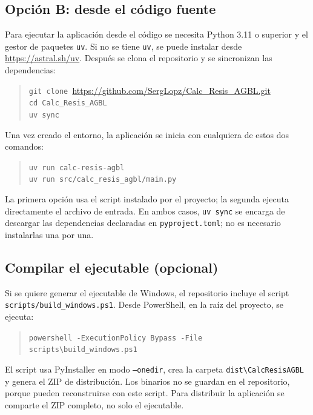 \documentclass[journal]{IEEEtran}
\begin{document}
\subsection{Opción B: desde el código fuente}

Para ejecutar la aplicación desde el código se necesita Python 3.11 o superior y el gestor de paquetes \texttt{uv}. Si no se tiene \texttt{uv}, se puede instalar desde \url{https://astral.sh/uv}. Después se clona el repositorio y se sincronizan las dependencias:
\begin{quote}
  \small
  \noindent\texttt{git clone }\url{https://github.com/SergLopz/Calc_Resis_AGBL.git}\\
  \texttt{cd Calc\_Resis\_AGBL}\\
  \texttt{uv sync}
\end{quote}

Una vez creado el entorno, la aplicación se inicia con cualquiera de estos dos comandos:
\begin{quote}
  \small
  \noindent\texttt{uv run calc-resis-agbl}\\
  \texttt{uv run src/calc\_resis\_agbl/main.py}
\end{quote}

La primera opción usa el script instalado por el proyecto; la segunda ejecuta directamente el archivo de entrada. En ambos casos, \texttt{uv sync} se encarga de descargar las dependencias declaradas en \texttt{pyproject.toml}; no es necesario instalarlas una por una.

\subsection{Compilar el ejecutable (opcional)}

Si se quiere generar el ejecutable de Windows, el repositorio incluye el script \texttt{scripts/build\_windows.ps1}. Desde PowerShell, en la raíz del proyecto, se ejecuta:
\begin{quote}
  \small
  \noindent\texttt{powershell -ExecutionPolicy Bypass -File scripts\textbackslash build\_windows.ps1}
\end{quote}

El script usa PyInstaller en modo \texttt{--onedir}, crea la carpeta \texttt{dist\textbackslash CalcResisAGBL} y genera el ZIP de distribución. Los binarios no se guardan en el repositorio, porque pueden reconstruirse con este script. Para distribuir la aplicación se comparte el ZIP completo, no solo el ejecutable.
\end{document}
